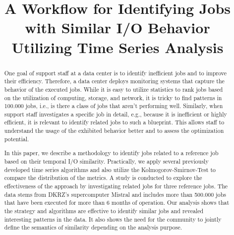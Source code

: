 \documentclass{jhps}
\begin{document}


\title{A Workflow for Identifying Jobs with Similar I/O Behavior Utilizing Time Series Analysis}


\maketitle


\begin{abstract}

One goal of support staff at a data center is to identify inefficient jobs and to improve their efficiency.
Therefore, a data center deploys monitoring systems that capture the behavior of the executed jobs.
While it is easy to utilize statistics to rank jobs based on the utilization of computing, storage, and network, it is tricky to find patterns in 100.000 jobs, i.e., is there a class of jobs that aren't performing well.
Similarly, when support staff investigates a specific job in detail, e.g., because it is inefficient or highly efficient, it is relevant to identify related jobs to such a blueprint.
This allows staff to understand the usage of the exhibited behavior better and to assess the optimization potential.

\medskip

In this paper, we describe a methodology to identify jobs related to a reference job based on their temporal I/O similarity.
Practically, we apply several previously developed time series algorithms and also utilize the Kolmogorov-Smirnov-Test to compare the distribution of the metrics.
A study is conducted to explore the effectiveness of the approach by investigating  related jobs for three reference jobs.
The data stems from DKRZ's supercomputer Mistral and includes more than 500.000 jobs that have been executed for more than 6 months of operation. Our analysis shows that the strategy and algorithms are effective to identify similar jobs and revealed interesting patterns in the data.
It also shows the need for the community to jointly define the semantics of similarity depending on the analysis purpose.
\end{abstract}
\end{document}
